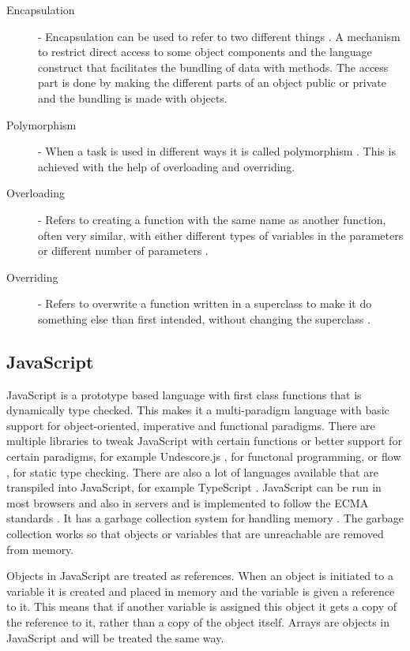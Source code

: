 \documentclass {article}
\begin{document}
\begin{description}
\item [Encapsulation] - Encapsulation can be used to refer to two different things \cite{gabmar, skansholm}. A mechanism to restrict direct access to some object components and the language construct that facilitates the bundling of data with methods. The access part is done by making the different parts of an object public or private and the bundling is made with objects.

\item [Polymorphism] - When a task is used in different ways it is called polymorphism \cite{gabmar, skansholm}. This is achieved with the help of overloading and overriding.

\item[Overloading] - Refers to creating a function with the same name as another function, often very similar, with either different types of variables in the parameters or different number of parameters \cite{skansholm}.

\item[Overriding] - Refers to overwrite a function written in a superclass to make it do something else than first intended, without changing the superclass \cite{skansholm}.
\end{description}
\subsection{JavaScript}
\label{sec:javascript}
JavaScript is a prototype based language with first class functions that is dynamically type checked. This makes it a multi-paradigm language with basic support for object-oriented, imperative and functional paradigms. There are multiple libraries to tweak JavaScript with certain functions or better support for certain paradigms, for example Undescore.js \cite{underscorejs}, for functonal programming, or flow \cite{flow}, for static type checking. There are also a lot of languages available that are transpiled into JavaScript, for example TypeScript \cite{typescript}. 
JavaScript can be run in most browsers and also in servers and is implemented to follow the ECMA standards \cite{ecma6table}. It has a garbage collection system for handling memory \cite{mozillamem}. The garbage collection works so that objects or variables that are unreachable are removed from memory. 

Objects in JavaScript are treated as references. When an object is initiated to a variable it is created and placed in memory and the variable is given a reference to it. This means that if another variable is assigned this object it gets a copy of the reference to it, rather than a copy of the object itself. Arrays are objects in JavaScript and will be treated the same way.
\end{document}
